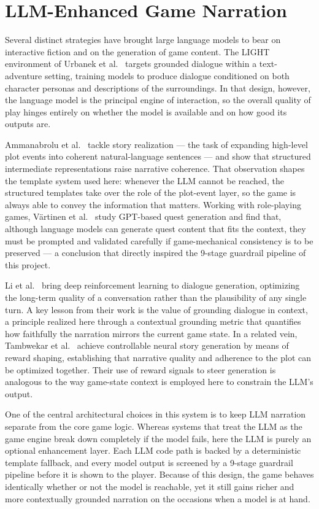 \documentclass[12pt, a4paper, oneside]{report}
\begin{document}
\section{LLM-Enhanced Game Narration}
\label{sec:llm-narration}

Several distinct strategies have brought large language models to bear on interactive fiction and on the generation of game content. The LIGHT environment of Urbanek et al.~\cite{urbanek2019light} targets grounded dialogue within a text-adventure setting, training models to produce dialogue conditioned on both character personas and descriptions of the surroundings. In that design, however, the language model is the principal engine of interaction, so the overall quality of play hinges entirely on whether the model is available and on how good its outputs are.

Ammanabrolu et al.~\cite{ammanabrolu2020story} tackle story realization --- the task of expanding high-level plot events into coherent natural-language sentences --- and show that structured intermediate representations raise narrative coherence. That observation shapes the template system used here: whenever the LLM cannot be reached, the structured templates take over the role of the plot-event layer, so the game is always able to convey the information that matters. Working with role-playing games, V\"{a}rtinen et al.~\cite{vartinen2022quests} study GPT-based quest generation and find that, although language models can generate quest content that fits the context, they must be prompted and validated carefully if game-mechanical consistency is to be preserved --- a conclusion that directly inspired the 9-stage guardrail pipeline of this project.

Li et al.~\cite{li2016dialogue} bring deep reinforcement learning to dialogue generation, optimizing the long-term quality of a conversation rather than the plausibility of any single turn. A key lesson from their work is the value of grounding dialogue in context, a principle realized here through a contextual grounding metric that quantifies how faithfully the narration mirrors the current game state. In a related vein, Tambwekar et al.~\cite{tambwekar2019controllable} achieve controllable neural story generation by means of reward shaping, establishing that narrative quality and adherence to the plot can be optimized together. Their use of reward signals to steer generation is analogous to the way game-state context is employed here to constrain the LLM's output.

One of the central architectural choices in this system is to keep LLM narration separate from the core game logic. Whereas systems that treat the LLM as the game engine break down completely if the model fails, here the LLM is purely an optional enhancement layer. Each LLM code path is backed by a deterministic template fallback, and every model output is screened by a 9-stage guardrail pipeline before it is shown to the player. Because of this design, the game behaves identically whether or not the model is reachable, yet it still gains richer and more contextually grounded narration on the occasions when a model is at hand.
\end{document}
